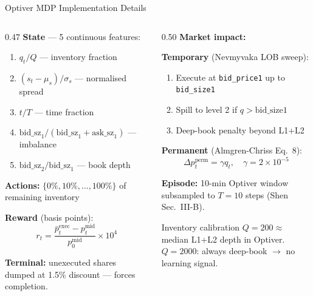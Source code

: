 \documentclass[aspectratio=169, 10pt]{beamer}
\begin{document}
\begin{frame}{Optiver MDP Implementation Details}
  \begin{columns}[T]
    \begin{column}{0.47\textwidth}
      \textbf{State} — 5 continuous features:
      \begin{enumerate}\small
        \item $q_t/Q$ — inventory fraction
        \item $(s_t-\mu_s)/\sigma_s$ — normalised spread
        \item $t/T$ — time fraction
        \item $\text{bid\_sz}_1/(\text{bid\_sz}_1{+}\text{ask\_sz}_1)$ — imbalance
        \item $\text{bid\_sz}_2/\text{bid\_sz}_1$ — book depth
      \end{enumerate}

      \medskip
      \textbf{Actions:} $\{0\%,10\%,\ldots,100\%\}$ of remaining inventory

      \medskip
      \textbf{Reward} (basis points):
      $$r_t = \frac{\bar{p}_t^{\text{exec}} - p_t^{\text{mid}}}{p_0^{\text{mid}}} \times 10^4$$

      \textbf{Terminal:} unexecuted shares dumped
      at 1.5\% discount — forces completion.
    \end{column}
    \begin{column}{0.50\textwidth}
      \textbf{Market impact:}

      \smallskip
      \textbf{Temporary} (Nevmyvaka LOB sweep):
      \begin{enumerate}\small
        \item Execute at \texttt{bid\_price1} up to \texttt{bid\_size1}
        \item Spill to level 2 if $q>\text{bid\_size1}$
        \item Deep-book penalty beyond L1+L2
      \end{enumerate}

      \medskip
      \textbf{Permanent} (Almgren-Chriss Eq.\ 8):
      $$\Delta p^{\text{perm}}_t = \gamma q_t,\quad \gamma = 2\!\times\!10^{-5}$$

      \medskip
      \textbf{Episode:} 10-min Optiver window
      subsampled to $T{=}10$ steps (Shen Sec.\ III-B).
      
      \begin{alertblock}{Inventory calibration}
        \small $Q{=}200\approx$ median L1+L2 depth in Optiver.\\
        $Q{=}2000$: always deep-book $\to$ no learning signal.
      \end{alertblock}
    \end{column}
  \end{columns}
\end{frame}
\end{document}
